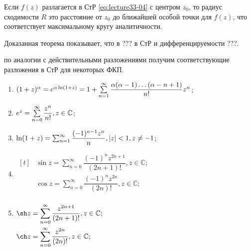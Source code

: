 \begin{notes}
\item Если $f(z)$ разлагается в СтР \eqref{eq:lecture33-04} с центром $z_0$, то радиус сходимости $R$
  это расстояние от $z_0$ до ближайшей особой точки для $f(z)$, что соответствует максимальному кругу
  аналитичности.
\item Доказанная теорема показывает, что в ??? в СтР и дифференцируемости ???.
\item по аналогии с действительными разложениями получим соответствующие разложения в СтР для
  некоторых ФКП.
  \begin{enumerate}
  \item $(1 + z)^{\alpha} = e^{\alpha \ln(1 + z)} = 1 +
    \sum\limits_{n = 1}^{\infty}\dfrac{\alpha(\alpha - 1) \ldots (\alpha - n + 1)}{n!}z^n$;
  \item $e^z = \sum\limits_{n = 0}^{\infty}\dfrac{z^n}{n!}, z \in \mathbb{C}$;
  \item $\ln(1 + z) = \sum_{n = 1}^{\infty}\dfrac{(-1)^{n - 1}z^n}{n}, \left\lvert z \right\rvert < 1, z \neq -1$;
  \item $\begin{aligned}[t]
    &\sin z = \sum_{n = 0}^{\infty}\dfrac{(-1)^nz^{2n + 1}}{(2n + 1)!}, z \in \mathbb{C};\\
    &\cos z = \sum_{n = 0}^{\infty}\dfrac{(-1)^nz^{2n}}{(2n)!}, z \in \mathbb{C}; \\
  \end{aligned}$
  \item $\begin{aligned}[t]
    &\sh z = \sum_{n = 0}^{\infty}\dfrac{z^{2n + 1}}{(2n + 1)!}, z \in \mathbb{C};\\
  	&\ch z = \sum_{n = 0}^{\infty}\dfrac{z^{2n}}{(2n)!}, z \in \mathbb{C}; \\
  \end{aligned}$
  \end{enumerate}
\end{notes}
